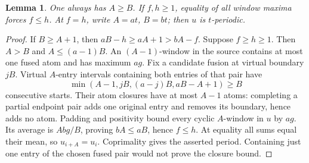 \documentclass[11pt,a4paper]{amsart}
\numberwithin{equation}{section}
\theoremstyle{plain}
\newtheorem{lemma}[theorem]{Lemma}
\theoremstyle{definition}
\begin{document}
\begin{lemma}\label{lem:fusion-average}
One always has \(A\ge B\).  If \(f,h\ge1\), equality of all window maxima forces \(f\le h\).  At \(f=h\), write \(A=at\), \(B=bt\); then \(u\) is \(t\)-periodic.
\end{lemma}
\begin{proof}
If \(B\ge A+1\), then \(aB-h\ge aA+1>bA-f\).  Suppose \(f\ge h\ge1\).  Then \(A>B\) and \(A\le(a-1)B\).  An \((A-1)\)-window in the source contains at most one fused atom and has maximum \(ag\).  Fix a candidate fusion at virtual boundary \(jB\).  Virtual \(A\)-entry intervals containing both entries of that pair have
\[
 \min(A-1,jB,(a-j)B,aB-A+1)\ge B
\]
consecutive starts.  Their atom closures have at most \(A-1\) atoms: completing a partial endpoint pair adds one original entry and removes its boundary, hence adds no atom.  Padding and positivity bound every cyclic \(A\)-window in \(u\) by \(ag\).  Its average is \(Abg/B\), proving \(bA\le aB\), hence \(f\le h\).  At equality all sums equal their mean, so \(u_{i+A}=u_i\).  Coprimality gives the asserted period.  Containing just one entry of the chosen fused pair would not prove the closure bound.
\end{proof}
\end{document}
